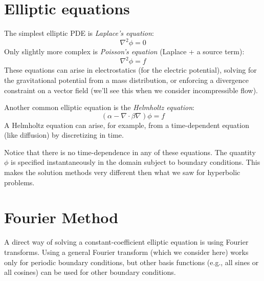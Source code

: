 \label{ch:multigrid}

\section{Elliptic equations}

The simplest elliptic PDE is {\em Laplace's equation}:
\begin{equation}
\nabla^2 \phi = 0
\end{equation}
Only slightly more complex is {\em Poisson's equation} (Laplace + a source term):
\begin{equation}
\nabla^2 \phi = f
\end{equation}
These equations can arise in electrostatics (for the electric potential),
solving for the gravitational potential from a mass distribution, or
enforcing a divergence constraint on a vector field (we'll see this
when we consider incompressible flow).

Another common elliptic equation is the {\em Helmholtz equation}:
\begin{equation}
(\alpha - \nabla \cdot \beta \nabla) \phi = f
\end{equation}
A Helmholtz equation can arise, for example, from a time-dependent
equation (like diffusion) by discretizing in time.

Notice that there is no time-dependence in any of these equations.
The quantity $\phi$ is specified instantaneously in the domain subject to
boundary conditions.  This makes the solution methods very different then
what we saw for hyperbolic problems.


\section{\label{elliptic:sec:fft} Fourier Method}

A direct way of solving a constant-coefficient elliptic equation is
using Fourier transforms.  Using a general Fourier transform (which we
consider here) works only for periodic boundary conditions, but other
basis functions (e.g., all sines or all cosines) can be used for other
boundary conditions. 

